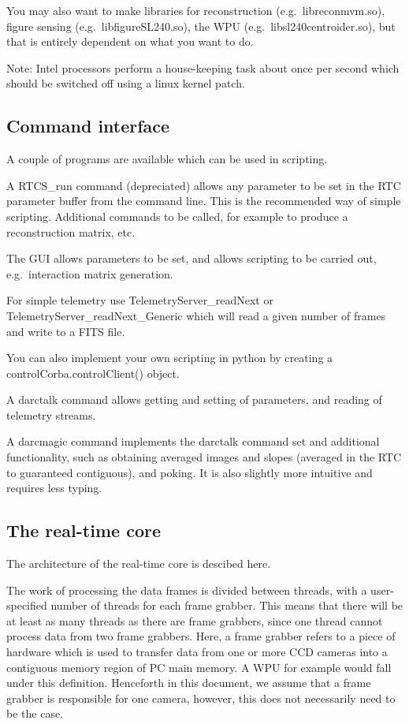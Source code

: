 \documentclass[a4,10pt]{article}
\begin{document}
You may also want to make libraries for reconstruction
(e.g.\ libreconmvm.so), figure sensing (e.g.\ libfigureSL240.so), the
WPU (e.g.\ libsl240centroider.so), but that is entirely dependent on
what you want to do.

Note: Intel processors perform a house-keeping task about once per second
which should be switched off using a linux kernel patch.


\subsection{Command interface}
A couple of programs are available which can be used in scripting.  

A RTCS\_run command (depreciated) allows any parameter to be set in the RTC
parameter buffer from the command line.  This is the recommended way
of simple scripting.  Additional commands to be called, for example to
produce a reconstruction matrix, etc.

The GUI allows parameters to be set, and allows scripting to be
carried out, e.g.\ interaction matrix generation.

For simple telemetry use TelemetryServer\_readNext or
TelemetryServer\_readNext\_Generic which will read a given number of
frames and write to a FITS file.

You can also implement your own scripting in python by creating a
controlCorba.controlClient() object.

A darctalk command allows getting and setting of parameters, and
reading of telemetry streams.

A darcmagic command implements the darctalk command set and additional
functionality, such as obtaining averaged images and slopes (averaged
in the RTC to guaranteed contiguous), and poking.  It is also slightly
more intuitive and requires less typing. 

\subsection{The real-time core}

The architecture of the real-time core is descibed here.

The work of processing the data frames is divided between threads,
with a user-specified number of threads for each frame grabber.  This
means that there will be at least as many threads as there are frame
grabbers, since one thread cannot process data from two frame
grabbers.  Here, a frame grabber refers to a piece of hardware which
is used to transfer data from one or more CCD cameras into a
contiguous memory region of PC main memory.  A WPU for example would
fall under this definition.  Henceforth in this document, we assume
that a frame grabber is responsible for one camera, however, this does
not necessarily need to be the case.
\end{document}
